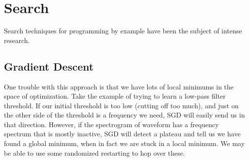 \section{Search}

Search techniques for programming by example have been the subject of intense research.


\subsection{Gradient Descent}

One trouble with this approach is that we have lots of local minimums in the space of optimization.
Take the example of trying to learn a low-pass filter threshold.
If our initial threshold is too low (cutting off too much), and just on the other side of the threshold is a frequency we need, SGD will easily send us in that direction.
However, if the spectrogram of waveform has a frequency spectrum that is mostly inactive, SGD will detect a plateau and tell us we have found a global minimum, when in fact we are stuck in a local minimum.
We may be able to use some randomized restarting to hop over these.

